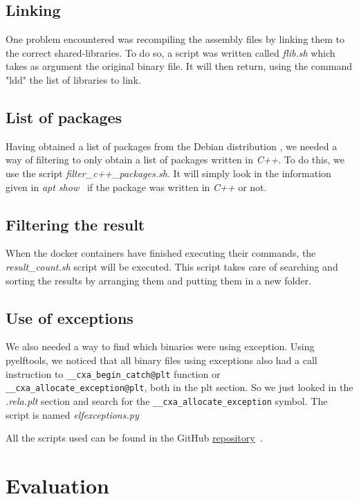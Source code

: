 \documentclass[a4paper,11pt,oneside]{report}
\begin{document}
\section{Linking}
One problem encountered was recompiling the
assembly files by linking them to the correct shared-libraries. To do so, a 
script was written called  \textit{flib.sh} which takes as argument the original binary
file. It will then return, using the command "ldd"\cite{ldd} the list of
libraries to link. 

\section{List of packages}

Having obtained a list of packages from the Debian distribution
\cite{sourcePackage}, we needed a way of filtering to only obtain
a list of packages written in \textit{C++}. To do this, we use the script
\textit{filter\_c++\_packages.sh}. It will simply look in the information given
in \textit{apt show}~\cite{apt} if the package was written in \textit{C++} or
not. 

\section{Filtering the result}
When the docker containers have finished executing their commands, the
\textit{result\_count.sh} script will be executed. This script takes care of searching
and sorting the results by arranging them and putting them in a new folder.

\section{Use of exceptions}
We also needed a way to find which binaries were using exception. Using
pyelftools, we noticed that all binary files using exceptions also had a call
instruction to \verb|__cxa_begin_catch@plt| function or
\verb|__cxa_allocate_exception@plt|, both in the plt section. So we just looked
in the \textit{.rela.plt} section and search for the
\verb|__cxa_allocate_exception| symbol. The script is named
\textit{elfexceptions.py}


All the scripts used can be found in the GitHub
\href{https://github.com/ha2san/debian_docker/tree/main/scripts}{repository}~\cite{repo}.

\chapter{Evaluation}
\end{document}
